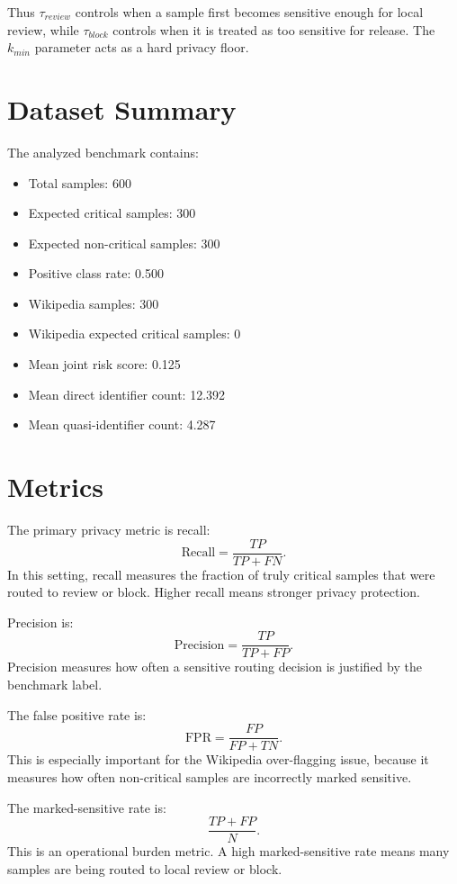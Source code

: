 \documentclass[11pt]{article}
\begin{document}
Thus $\tau_{review}$ controls when a sample first becomes sensitive enough for
local review, while $\tau_{block}$ controls when it is treated as too sensitive
for release. The $k_{min}$ parameter acts as a hard privacy floor.

\section{Dataset Summary}

The analyzed benchmark contains:

\begin{itemize}
    \item Total samples: 600
    \item Expected critical samples: 300
    \item Expected non-critical samples: 300
    \item Positive class rate: 0.500
    \item Wikipedia samples: 300
    \item Wikipedia expected critical samples: 0
    \item Mean joint risk score: 0.125
    \item Mean direct identifier count: 12.392
    \item Mean quasi-identifier count: 4.287
\end{itemize}

\section{Metrics}

The primary privacy metric is recall:
\[
    \mathrm{Recall}
    =
    \frac{TP}{TP + FN}.
\]
In this setting, recall measures the fraction of truly critical samples that
were routed to review or block. Higher recall means stronger privacy protection.

Precision is:
\[
    \mathrm{Precision}
    =
    \frac{TP}{TP + FP}.
\]
Precision measures how often a sensitive routing decision is justified by the
benchmark label.

The false positive rate is:
\[
    \mathrm{FPR}
    =
    \frac{FP}{FP + TN}.
\]
This is especially important for the Wikipedia over-flagging issue, because it
measures how often non-critical samples are incorrectly marked sensitive.

The marked-sensitive rate is:
\[
    \frac{TP + FP}{N}.
\]
This is an operational burden metric. A high marked-sensitive rate means many
samples are being routed to local review or block.
\end{document}
